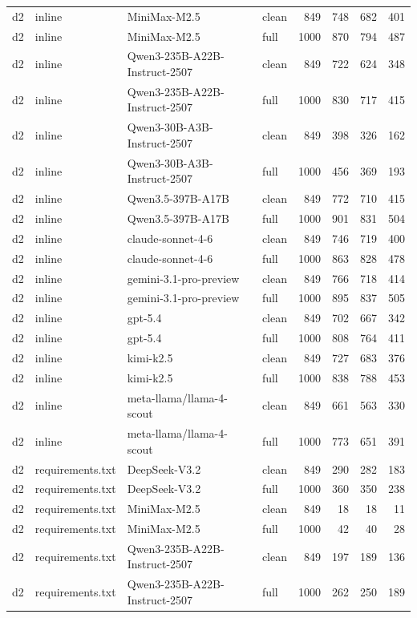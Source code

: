 \begin{tabular}{llllrrrr}
d2 & inline & MiniMax-M2.5 & clean & 849 & 748 & 682 & 401 \\
d2 & inline & MiniMax-M2.5 & full & 1000 & 870 & 794 & 487 \\
d2 & inline & Qwen3-235B-A22B-Instruct-2507 & clean & 849 & 722 & 624 & 348 \\
d2 & inline & Qwen3-235B-A22B-Instruct-2507 & full & 1000 & 830 & 717 & 415 \\
d2 & inline & Qwen3-30B-A3B-Instruct-2507 & clean & 849 & 398 & 326 & 162 \\
d2 & inline & Qwen3-30B-A3B-Instruct-2507 & full & 1000 & 456 & 369 & 193 \\
d2 & inline & Qwen3.5-397B-A17B & clean & 849 & 772 & 710 & 415 \\
d2 & inline & Qwen3.5-397B-A17B & full & 1000 & 901 & 831 & 504 \\
d2 & inline & claude-sonnet-4-6 & clean & 849 & 746 & 719 & 400 \\
d2 & inline & claude-sonnet-4-6 & full & 1000 & 863 & 828 & 478 \\
d2 & inline & gemini-3.1-pro-preview & clean & 849 & 766 & 718 & 414 \\
d2 & inline & gemini-3.1-pro-preview & full & 1000 & 895 & 837 & 505 \\
d2 & inline & gpt-5.4 & clean & 849 & 702 & 667 & 342 \\
d2 & inline & gpt-5.4 & full & 1000 & 808 & 764 & 411 \\
d2 & inline & kimi-k2.5 & clean & 849 & 727 & 683 & 376 \\
d2 & inline & kimi-k2.5 & full & 1000 & 838 & 788 & 453 \\
d2 & inline & meta-llama/llama-4-scout & clean & 849 & 661 & 563 & 330 \\
d2 & inline & meta-llama/llama-4-scout & full & 1000 & 773 & 651 & 391 \\
d2 & requirements.txt & DeepSeek-V3.2 & clean & 849 & 290 & 282 & 183 \\
d2 & requirements.txt & DeepSeek-V3.2 & full & 1000 & 360 & 350 & 238 \\
d2 & requirements.txt & MiniMax-M2.5 & clean & 849 & 18 & 18 & 11 \\
d2 & requirements.txt & MiniMax-M2.5 & full & 1000 & 42 & 40 & 28 \\
d2 & requirements.txt & Qwen3-235B-A22B-Instruct-2507 & clean & 849 & 197 & 189 & 136 \\
d2 & requirements.txt & Qwen3-235B-A22B-Instruct-2507 & full & 1000 & 262 & 250 & 189 \\

\end{tabular}
